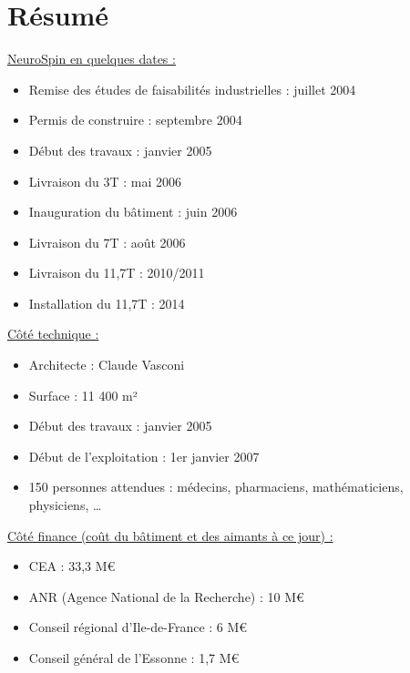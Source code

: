 \section{Résumé}

\underline{NeuroSpin en quelques dates :}

\begin{itemize}
	\smallskip
	\item Remise des études de faisabilités industrielles : juillet 2004
	\item Permis de construire : septembre 2004
	\item Début des travaux : janvier 2005
	\item Livraison du 3T : mai 2006
	\item Inauguration du bâtiment : juin 2006
	\item Livraison du 7T : août 2006
	\item Livraison du 11,7T : 2010/2011
	\item Installation du 11,7T : 2014 
\end{itemize}
\medskip

\underline{Côté technique :}

\begin{itemize}
	\smallskip
	\item  Architecte : Claude Vasconi
	\item  Surface : 11 400 m²
	\item  Début des travaux : janvier 2005
	\item  Début de l’exploitation : 1er janvier 2007
	\item  150 personnes attendues : médecins, pharmaciens, mathématiciens, physiciens, …
\end{itemize}
\medskip

\underline{Côté finance (coût du bâtiment et des aimants à ce jour) :}

\begin{itemize}
	\smallskip
	\item CEA : 33,3 M\euro
	\item ANR (Agence National de la Recherche) : 10 M\euro
	\item Conseil régional d’Ile-de-France : 6 M\euro
	\item Conseil général de l’Essonne : 1,7 M\euro
\end{itemize}